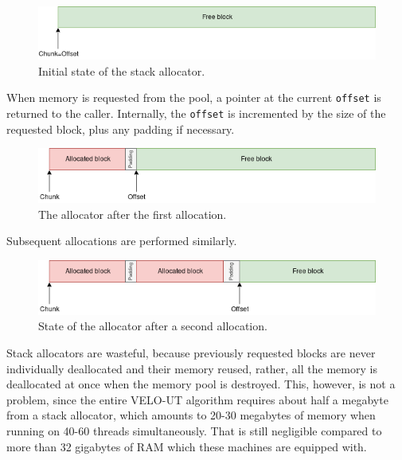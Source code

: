 \documentclass[12pt]{article}
\newcommand{\code}[1]{\texttt{#1}}
\begin{document}
\begin{figure}[H]
	\begin{center}
		\includegraphics[width=\textwidth]{velout_stack_allocator_initial}
	\end{center}
	\caption{Initial state of the stack allocator.}
	\label{fig_velout_stack_allocator_initial}
\end{figure}

When memory is requested from the pool, a pointer at the current \code{offset} is returned to the caller. Internally, the \code{offset} is incremented by the size of the requested block, plus any padding if necessary.

\begin{figure}[H]
	\begin{center}
		\includegraphics[width=\textwidth]{velout_stack_allocator_alloc1}
	\end{center}
	\caption{The allocator after the first allocation.}
	\label{fig_velout_stack_allocator_alloc1}
\end{figure}

Subsequent allocations are performed similarly.

\begin{figure}[H]
	\begin{center}
		\includegraphics[width=\textwidth]{velout_stack_allocator_alloc2}
	\end{center}
	\caption{State of the allocator after a second allocation.}
	\label{fig_velout_stack_allocator_alloc2}
\end{figure}

Stack allocators are wasteful, because previously requested blocks are never individually deallocated and their memory reused, rather, all the memory is deallocated at once when the memory pool is destroyed. This, however, is not a problem, since the entire VELO-UT algorithm requires about half a megabyte from a stack allocator, which amounts to 20-30 megabytes of memory when running on 40-60 threads simultaneously. That is still negligible compared to more than 32 gigabytes of RAM which these machines are equipped with.
\end{document}
